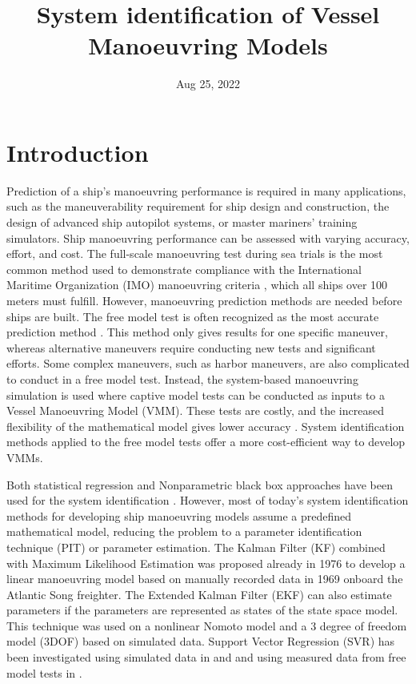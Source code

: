 \documentclass[review]{elsarticle}
\title{System identification of Vessel Manoeuvring Models}
\date{Aug 25, 2022}
\begin{document}



\pagestyle{empty}

\pagestyle{plain}

\pagestyle{normal}
\label{\detokenize{index::doc}}



\section{Introduction}
\label{\detokenize{00.02_introduction:introduction}}\label{\detokenize{00.02_introduction::doc}}
% 
Prediction of a ship's manoeuvring performance is required in many applications, such as the maneuverability requirement for ship design and construction, the design of advanced ship autopilot systems, or master mariners' training simulators. Ship manoeuvring performance can be assessed with varying accuracy, effort, and cost. The full-scale manoeuvring test during sea trials is the most common method used to demonstrate compliance with the International Maritime Organization (IMO) manoeuvring criteria \cite{imo_standards_2002}, which all ships over 100 meters must fulfill. However, manoeuvring prediction methods are needed before ships are built. The free model test is often recognized as the most accurate prediction method \cite{ittc_maneuvering_2008}.
This method only gives results for one specific maneuver, whereas alternative maneuvers require conducting new tests and significant efforts. Some complex maneuvers, such as harbor maneuvers, are also complicated to conduct in a free model test.
Instead, the system-based manoeuvring simulation is used where captive model tests can be conducted as inputs to a Vessel Manoeuvring Model (VMM). These tests are costly, and the increased flexibility of the mathematical model gives lower accuracy \cite{ittc_maneuvering_2008}.
System identification methods applied to the free model tests offer a more cost-efficient way to develop VMMs.

Both statistical regression and Non\sphinxhyphen{}parametric black box approaches have been used for the system identification \cite{he_nonparametric_2022}.  However, most of today's system identification methods for developing ship manoeuvring models assume a predefined mathematical model, reducing the problem to a parameter identification technique (PIT) or parameter estimation.
The Kalman Filter (KF) combined with Maximum Likelihood Estimation was proposed already in 1976 \cite{astrom_identification_1976} to develop a linear manoeuvring model based on manually recorded data in 1969 onboard the Atlantic Song freighter. The Extended Kalman Filter (EKF) can also estimate parameters if the parameters are represented as states of the state space model. This technique was used on a nonlinear Nomoto model \cite{perera_system_2015} and a 3 degree of freedom model (3DOF) \cite{shi_identification_2009} based on simulated data.
Support Vector Regression (SVR) has been investigated using simulated data in \cite{zhu_parameter_2017} and \cite{wang_parameter_2021} and using measured data from free model tests in \cite{luo_parameter_2016}.
\end{document}
